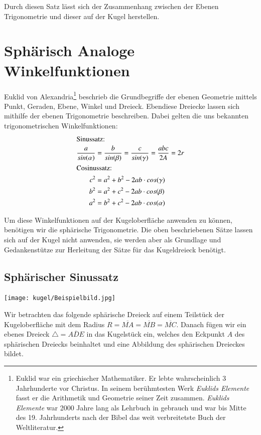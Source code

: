 \begin{refsection}
Durch diesen Satz lässt sich der Zusammenhang zwischen der Ebenen Trigonometrie und dieser auf der Kugel herstellen.



\section{Sphärisch Analoge Winkelfunktionen}
Euklid von Alexandria\footnote{%
Euklid war ein griechischer Mathematiker. Er lebte wahrscheinlich 3 Jahrhunderte vor Christus. In seinem berühmtesten Werk \textit{Euklids Elemente} fasst er die Arithmetik und Geometrie seiner Zeit zusammen. \textit{Euklids Elemente} war 2000 Jahre lang als Lehrbuch in gebrauch und war bis Mitte des 19. Jahrhunderts nach der Bibel das weit verbreitetste Buch der Weltliteratur.}  beschrieb die Grundbegriffe der ebenen Geometrie mittels Punkt, Geraden, Ebene, Winkel und Dreieck. Ebendiese Dreiecke lassen sich mithilfe der ebenen Trigonometrie beschreiben. Dabei gelten die uns bekannten trigonometrischen Winkelfunktionen:
\begin{align*}
\intertext{Sinussatz:}
\frac{ a }{ sin(\alpha) } &= \frac{ b }{sin(\beta)} = \frac{ c }{ sin(\gamma) } = \frac{abc}{2A} = 2r\\
\intertext{Cosinussatz:}
c^{ 2 } &= a^{ 2 } + b^{ 2 } - 2ab\cdot cos(\gamma)\\
b^{ 2 } &= a^{ 2 } + c^{ 2 } - 2ab\cdot cos(\beta)\\
a^{ 2 } &= b^{ 2 } + c^{ 2 } - 2ab\cdot cos(\alpha)
\end{align*}

Um diese Winkelfunktionen auf der Kugeloberfläche anwenden zu können, benötigen wir die sphärische Trigonometrie. Die oben beschriebenen Sätze lassen sich auf der Kugel nicht anwenden, sie werden aber als Grundlage und Gedankenstütze zur Herleitung der Sätze für das Kugeldreieck benötigt.

\subsection{Sphärischer Sinussatz}

\begin{center}
        \texttt{[image: kugel/Beispielbild.jpg]}
\end{center}


Wir betrachten das folgende sphärische Dreieck auf einem Teilstück der Kugeloberfläche mit dem Radius $R= \overline{MA} = \overline{MB} = \overline{MC}$. Danach fügen wir ein ebenes Dreieck $\triangle=\overline{ADE}$ in das Kugelstück ein, welches den Eckpunkt $A$ des sphärischen Dreiecks beinhaltet und eine Abbildung des sphärischen Dreieckes bildet.


\end{refsection}
